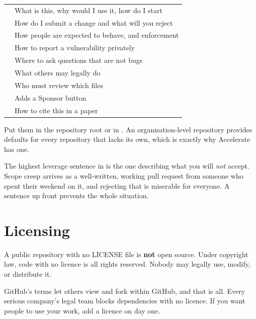 \documentclass[11pt]{article}
\begin{document}
\vspace{0.5em}
\begin{tabularx}{\linewidth}{@{}L{4.2cm} X@{}}
\toprule
{} &  \\
\midrule
{} & What is this, why would I use it, how do I start \\
 & How do I submit a change and what will you reject \\
 & How people are expected to behave, and enforcement \\
 & How to report a vulnerability privately \\
 & Where to ask questions that are not bugs \\
 & What others may legally do \\
 & Who must review which files \\
 & Adds a Sponsor button \\
 & How to cite this in a paper \\
\bottomrule
\end{tabularx}
\vspace{0.5em}

Put them in the repository root or in . An organisation-level
 repository provides defaults for every repository that lacks its own,
which is exactly why Accelerate has one.

\begin{note}
The highest leverage sentence in  is the one describing what you
will \emph{not} accept. Scope creep arrives as a well-written, working pull request
from someone who spent their weekend on it, and rejecting that is miserable for
everyone. A sentence up front prevents the whole situation.
\end{note}

\section{Licensing}

\begin{trap}
A public repository with no LICENSE file is \textbf{not} open source. Under
copyright law, code with no licence is all rights reserved. Nobody may legally use,
modify, or distribute it.

GitHub's terms let others view and fork within GitHub, and that is all. Every serious
company's legal team blocks dependencies with no licence. If you want people to use
your work, add a licence on day one.
\end{trap}
\end{document}
